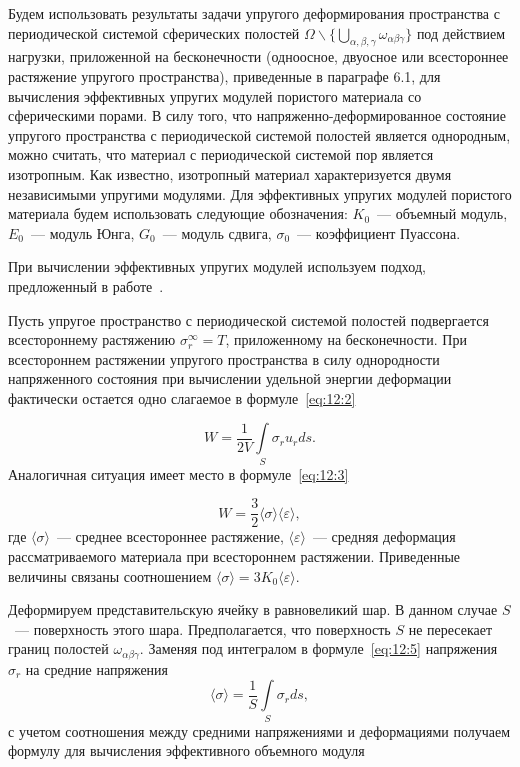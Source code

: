 Будем использовать результаты задачи упругого деформирования пространства с периодической системой сферических полостей $\Omega\backslash\bigg\{\bigcup\limits_{\alpha,\beta,\gamma}\omega_{\alpha\beta\gamma}\bigg\}$ под действием нагрузки, приложенной на бесконечности (одноосное, двуосное или всестороннее растяжение упругого пространства), приведенные в параграфе 6.1, для вычисления эффективных упругих модулей пористого материала со сферическими порами. В силу того, что на\-пряжен\-но-де\-фор\-ми\-ро\-ван\-ное состояние упругого пространства с периодической системой полостей является однородным, можно считать, что материал с периодической системой пор является изотропным. Как известно, изотропный материал характеризуется двумя независимыми упругими модулями. Для эффективных упругих модулей пористого материала будем использовать следующие обозначения: $K_0$~--- объемный модуль, $E_0$~--- модуль Юнга, $G_0$~--- модуль сдвига, $\sigma_0$~--- коэффициент Пуассона.

При вычислении эффективных упругих модулей используем подход, предложенный в работе~\cite{Vanin1985}.

Пусть упругое пространство с периодической системой полостей подвергается всестороннему растяжению $\sigma_r^\infty=T$, приложенному на бесконечности. При всестороннем растяжении упругого пространства в силу однородности напряженного состояния при вычислении удельной энергии деформации фактически остается одно слагаемое в формуле~\eqref{eq:12:2}

\begin{equation}
W=\frac{1}{2V}\int\limits_S\sigma_{r}u_r ds.
\label{eq:12:5}
\end{equation}
Аналогичная ситуация имеет место в формуле~\eqref{eq:12:3}~\cite{Vanin1985}

\begin{equation}
W=\frac{3}{2}\langle\sigma\rangle\langle\varepsilon\rangle,
\label{eq:12:6}
\end{equation}
где $\langle\sigma\rangle$~--- среднее всестороннее растяжение, $\langle\varepsilon\rangle$~--- средняя деформация рассматриваемого материала при всестороннем растяжении. Приведенные величины связаны соотношением $\langle\sigma\rangle=3K_0\langle\varepsilon\rangle$.

Деформируем представительскую ячейку в равновеликий шар. В данном случае $S$~--- поверхность этого шара. Предполагается, что поверхность $S$ не пересекает границ полостей $\omega_{\alpha\beta\gamma}$. Заменяя под интегралом в формуле~\eqref{eq:12:5} напряжения $\sigma_r$ на средние напряжения
$$
\langle\sigma\rangle=\frac{1}{S}\int\limits_S\sigma_r ds,
$$
с учетом соотношения между средними напряжениями и деформациями получаем формулу для вычисления эффективного объемного модуля

